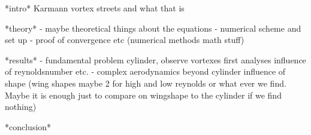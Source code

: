  

*intro*
Karmann vortex streets and what that is 

*theory*
- maybe theoretical things about the equations 
- ⁠numerical scheme and set up
- ⁠proof of convergence etc (numerical methods math stuff) 

*results* 
- ⁠fundamental problem cylinder, observe vortexes first analyses influence of reynoldsnumber etc.
- ⁠complex aerodynamics beyond cylinder influence of shape (wing shapes maybe 2 for high and low reynolds or what ever we find. Maybe it is enough just to compare on wingshape to the cylinder if we find nothing) 

*conclusion*